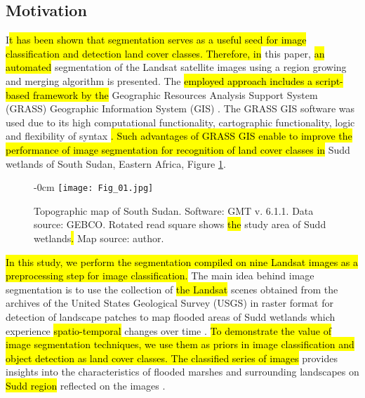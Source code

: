 \documentclass[sustainability,article,submit,pdftex,moreauthors]{Definitions/mdpi}
\begin{document}
\subsection{Motivation} 

I\hl{t has been shown that segmentation serves as a useful seed for image classification and detection land cover classes. Therefore, in} this paper, \hl{an automated} segmentation of the Landsat satellite images using a region growing and merging algorithm is presented. The \hl{employed approach includes a script-based framework by the }Geographic Resources Analysis Support System (GRASS) Geographic Information System (GIS) \cite{Neteleretal2008}. The GRASS GIS software was used due to its high computational functionality, cartographic functionality, logic and flexibility of syntax \cite{NetelerMitasova2008}\hl{. Such advantages of GRASS GIS enable to improve the performance of image segmentation for recognition of land cover classes in} Sudd wetlands of South Sudan, Eastern Africa, Figure \ref{fig01}. 

\begin{figure}[H]
\begin{adjustwidth}{-\extralength}{0cm}
	\hspace{130pt}\texttt{[image: Fig\_01.jpg]}
\end{adjustwidth}
\caption{Topographic map of South Sudan. Software: GMT v. 6.1.1. Data source: GEBCO. Rotated read square shows \hl{the }study area of Sudd wetlands\hl{. }Map source: author.
\label{fig01}}
\end{figure}

\hl{In this study, we perform the segmentation compiled on nine Landsat images as a preprocessing step for image classification. }The main idea behind image segmentation is to use the collection of \hl{the Landsat} scenes obtained from the archives of the United States Geological Survey (USGS) in raster format for detection of landscape patches to map flooded areas of Sudd wetlands which experience \hl{spatio-temporal} changes over time \cite{Petersen,SOSNOWSKI201651,Mulatu}. \hl{To demonstrate the value of image segmentation techniques, we use them as priors in image classification and object detection as land cover classes. The classified series of images }provides insights into the characteristics of flooded marshes and surrounding landscapes on \hl{Sudd region} reflected on the\hl{ } images \cite{CHEN201417}. 
\end{document}
